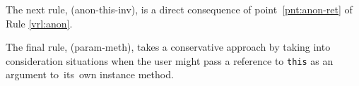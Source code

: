 \documentclass{pracamgr}
\theoremstyle{break}
\theoremstyle{break}
\theoremstyle{break}
\begin{document}
\begin{prooftree}
\end{prooftree}

\begin{prooftree}
\end{prooftree}

The next rule, (anon-this-inv), is a direct consequence of
point~\ref{pnt:anon-ret} of Rule \ref{vrl:anon}.

\begin{prooftree}
\end{prooftree}

\begin{prooftree}
\end{prooftree}

\begin{prooftree}
\end{prooftree}

The final rule, (param-meth), takes a conservative approach by taking
into consideration situations when the user might pass a reference to
\texttt{this} as an argument to~its~own instance method.

\begin{prooftree}
\end{prooftree}
\end{document}
